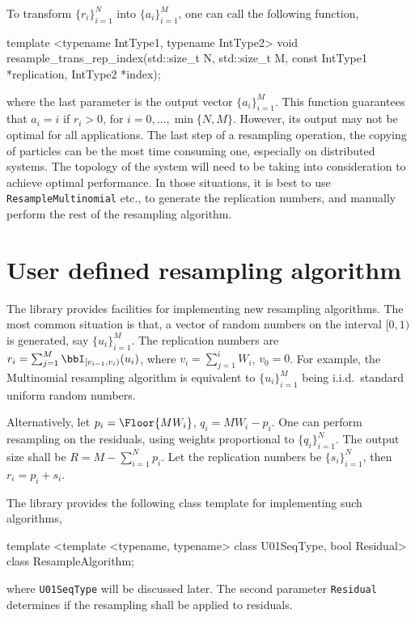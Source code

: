 To transform $\{r_i\}_{i=1}^N$ into $\{a_i\}_{i=1}^M$, one can call the
following function,
\begin{cppcode}
  template <typename IntType1, typename IntType2>
  void resample_trans_rep_index(std::size_t N, std::size_t M,
      const IntType1 *replication, IntType2 *index);
\end{cppcode}
where the last parameter is the output vector $\{a_i\}_{i=1}^M$. This function
guarantees that $a_i = i$ if $r_i > 0$, for $i = 0,\dots,\min\{N, M\}$.
However, its output may not be optimal for all applications. The last step of a
resampling operation, the copying of particles can be the most time consuming
one, especially on distributed systems. The topology of the system will need to
be taking into consideration to achieve optimal performance. In those
situations, it is best to use \verb|ResampleMultinomial| etc., to generate the
replication numbers, and manually perform the rest of the resampling algorithm.

\section{User defined resampling algorithm}
\label{sec:User defined resampling algorithm}

The library provides facilities for implementing new resampling algorithms.
The most common situation is that, a vector of random numbers on the interval
$[0, 1)$ is generated, say $\{u_i\}_{i=1}^M$. The replication numbers are $r_i
= \sum_{j=1}^M \bbI_{[v_{i-1},v_i)}(u_i)$, where $v_i = \sum_{j=1}^i W_i$, $v_0
= 0$. For example, the Multinomial resampling algorithm is equivalent to
$\{u_i\}_{i=1}^M$ being i.i.d.\ standard uniform random numbers.

Alternatively, let $p_i = \Floor{MW_i}$, $q_i = MW_i - p_i$. One can perform
resampling on the residuals, using weights proportional to $\{q_i\}_{i=1}^N$.
The output size shall be $R = M - \sum_{i=1}^N p_i$. Let the replication
numbers be $\{s_i\}_{i=1}^N$, then $r_i = p_i + s_i$.

The library provides the following class template for implementing such
algorithms,
\begin{cppcode}
  template <template <typename, typename> class U01SeqType, bool Residual>
  class ResampleAlgorithm;
\end{cppcode}
where \verb|U01SeqType| will be discussed later. The second parameter
\verb|Residual| determines if the resampling shall be applied to residuals.

